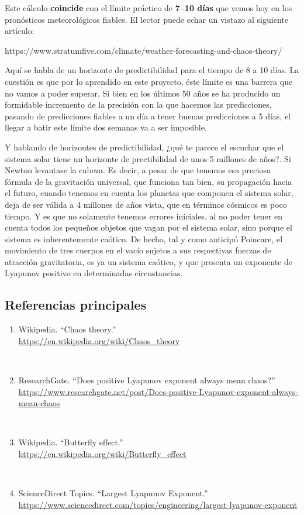 \documentclass[
  10pt,
  a4paper,
  DIV=11,
  numbers=noendperiod,
  open=any]{scrreprt}
\providecommand{\tightlist}{%
  \setlength{\itemsep}{0pt}\setlength{\parskip}{0pt}}
\numberwithin{equation}{chapter}
\numberwithin{equation}{chapter}
\renewcommand{\[}{\begin{equation}}
\renewcommand{\]}{\end{equation}}
\begin{document}
Este cálculo \textbf{coincide} con el límite práctico de \textbf{7--10
días} que vemos hoy en los pronósticos meteorológicos fiables. El lector
puede echar un vistazo al siguiente artículo:

https://www.stratumfive.com/climate/weather-forecasting-and-chaos-theory/

Aquí se habla de un horizonte de predictibilidad para el tiempo de 8 a
10 días. La cuestión es que por lo aprendido en este proyecto, éste
límite es una barrera que no vamos a poder superar. Si bien en los
últimos 50 años se ha producido un formidable incremento de la precisión
con la que hacemos las predicciones, pasando de predicciones fiables a
un día a tener buenas predicciones a 5 días, el llegar a batir este
límite dos semanas va a ser imposible.

Y hablando de horizontes de predictibilidad, ¿qué te parece el escuchar
que el sistema solar tiene un horizonte de prectibilidad de unos 5
millones de años?. Si Newton levantase la cabeza. Es decir, a pesar de
que tenemos esa preciosa fórmula de la gravitación universal, que
funciona tan bien, su propagación hacia el futuro, cuando tenemos en
cuenta los planetas que componen el sistema solar, deja de ser válida a
4 millones de años vista, que en términos cósmicos es poco tiempo. Y es
que no solamente tenemos errores iniciales, al no poder tener en cuenta
todos los pequeños objetos que vagan por el sistema solar, sino porque
el sistema es inherentemente caótico. De hecho, tal y como anticipó
Poincare, el movimiento de tres cuerpos en el vacío sujetos a sus
respectivas fuerzas de atracción gravitatoria, es ya un sistema caótico,
y que presenta un exponente de Lyapunov positivo en determinadas
circustancias.

\subsection{Referencias principales}\label{referencias-principales}

\begin{enumerate}
\def\labelenumi{\arabic{enumi}.}
\tightlist
\item
  Wikipedia. ``Chaos theory.''\\
  \url{https://en.wikipedia.org/wiki/Chaos_theory}\strut \\
\item
  ResearchGate. ``Does positive Lyapunov exponent always mean chaos?''\\
  \url{https://www.researchgate.net/post/Does-positive-Lyapunov-exponent-always-mean-chaos}\strut \\
\item
  Wikipedia. ``Butterfly effect.''\\
  \url{https://en.wikipedia.org/wiki/Butterfly_effect}\strut \\
\item
  ScienceDirect Topics. ``Largest Lyapunov Exponent.''\\
  \url{https://www.sciencedirect.com/topics/engineering/largest-lyapunov-exponent}
\end{enumerate}
\end{document}
